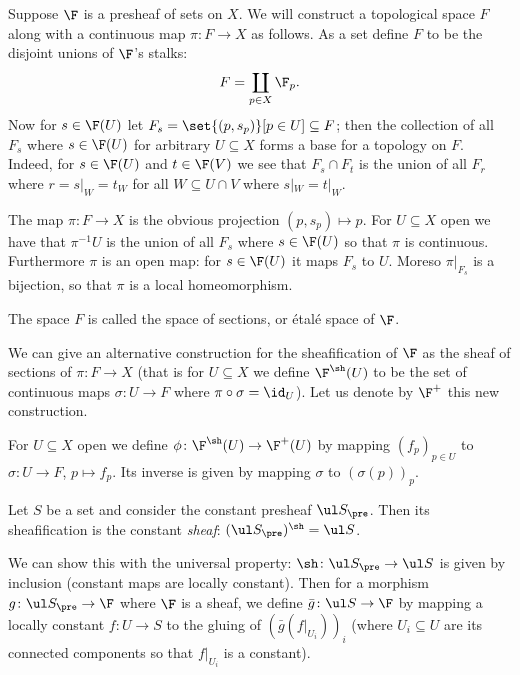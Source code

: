     Suppose $\F$ is a presheaf of sets on $X$.
    We will construct a topological space $F$ along with a continuous map $\pi\colon F\to X$ as follows.
    As a set define $F$ to be the disjoint unions of $\F$'s stalks:
    $$ F = \coprod_{p\in X}\F_p . $$
    Now for $s\in\F(U)$ let $F_s=\set{(p,s_p)}[p\in U]\subseteq F$; then the collection of all $F_s$ where $s\in\F(U)$ for arbitrary $U\subseteq X$
    forms a base for a topology on $F$.
    Indeed, for $s\in\F(U)$ and $t\in\F(V)$ we see that $F_s\cap F_t$ is the union of all $F_r$ where $r=s|_W=t_W$ for all $W\subseteq U\cap V$
    where $s|_W=t|_W$.

    The map $\pi\colon F\to X$ is the obvious projection $(p,s_p)\mapsto p$.
    For $U\subseteq X$ open we have that $\pi^{-1}U$ is the union of all $F_s$ where $s\in\F(U)$ so that $\pi$ is continuous.
    Furthermore $\pi$ is an open map: for $s\in\F(U)$ it maps $F_s$ to $U$.
    Moreso $\pi|_{F_s}$ is a bijection, so that $\pi$ is a local homeomorphism.

    The space $F$ is called the {\emphcolor space of sections}, or {\emphcolor \'etal\'e space} of $\F$.

    We can give an alternative construction for the sheafification of $\F$ as the sheaf of sections of $\pi\colon F\to X$
    (that is for $U\subseteq X$ we define $\F^\sh(U)$ to be the set of continuous maps $\sigma\colon U\to F$ where $\pi\circ\sigma=\id_U$).
    Let us denote by $\F^+$ this new construction.

    For $U\subseteq X$ open we define $\phi\colon\F^\sh(U)\to\F^+(U)$ by mapping $(f_p)_{p\in U}$ to $\sigma\colon U\to F$, $p\mapsto f_p$.
    Its inverse is given by mapping $\sigma$ to $(\sigma(p))_p$.

\eremark

\bexam

    Let $S$ be a set and consider the constant presheaf $\ul S_\pre$.
    Then its sheafification is the constant {\it sheaf\/}: $(\ul S_\pre)^\sh=\ul S$.

    We can show this with the universal property: $\sh\colon\ul S_\pre\to\ul S$ is given by inclusion (constant maps are locally constant).
    Then for a morphism $g\colon\ul S_\pre\to\F$ where $\F$ is a sheaf, we define $\bar g\colon\ul S\to\F$ by mapping a locally constant
    $f\colon U\to S$ to the gluing of $(\bar g(f|_{U_i}))_i$ (where $U_i\subseteq U$ are its connected components so that $f|_{U_i}$ is a constant).

\eexam


